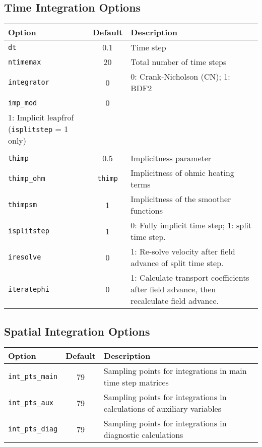 \subsection{Time Integration Options}
\begin{tabular}{lcp{3in}}
  \textbf{Option}&\textbf{Default}&\textbf{Description}\\
  \hline
  \texttt{dt}         & 0.1 & Time step\\
  \texttt{ntimemax}   & 20  & Total number of time steps\\
  \texttt{integrator} & 0   & 0: Crank-Nicholson (CN); 1: BDF2\\
  \texttt{imp\_mod}   & 0   & 
  \begin{minipage}[t]{3in}
    0: $\theta$-implicit\\
    1: Implicit leapfrof (\texttt{isplitstep} = 1 only)\\
  \end{minipage}\\
  \texttt{thimp}      & 0.5 & Implicitness parameter\\
  \texttt{thimp\_ohm} & \texttt{thimp} & 
                              Implicitness of ohmic heating terms\\
  \texttt{thimpsm}    & 1   & Implicitness of the smoother functions\\
  \texttt{isplitstep} & 1   & 0: Fully implicit time step; 
                              1: split time step.\\
  \texttt{iresolve}   & 0   & 1: Re-solve velocity after 
                              field advance of split time step.\\
  \texttt{iteratephi} & 0   & 1: Calculate transport coefficients after
    field advance, then recalculate field advance.
\end{tabular}


\subsection{Spatial Integration Options}
\begin{tabular}{lcp{3in}}
  \textbf{Option}&\textbf{Default}&\textbf{Description}\\
  \hline
  \texttt{int\_pts\_main}  & 79 & Sampling points for integrations in
                                main time step matrices\\
  \texttt{int\_pts\_aux}   & 79 & Sampling points for integrations in
                                calculations of auxiliary variables\\
  \texttt{int\_pts\_diag}  & 79 & Sampling points for integrations in
                                diagnostic calculations\\
\end{tabular}


